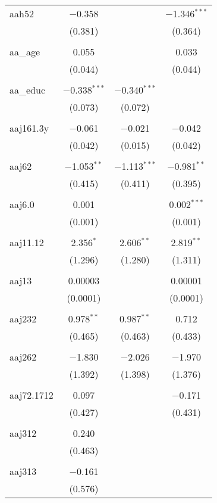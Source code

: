 \begin{table}[!htbp]
\begin{tabular}{@{\extracolsep{5pt}}lccc}
 aah52 & $-$0.358 &  & $-$1.346$^{***}$ \\ 
  & (0.381) &  & (0.364) \\ 
  & & & \\ 
 aa\_age & 0.055 &  & 0.033 \\ 
  & (0.044) &  & (0.044) \\ 
  & & & \\ 
 aa\_educ & $-$0.338$^{***}$ & $-$0.340$^{***}$ &  \\ 
  & (0.073) & (0.072) &  \\ 
  & & & \\ 
 aaj161.3y & $-$0.061 & $-$0.021 & $-$0.042 \\ 
  & (0.042) & (0.015) & (0.042) \\ 
  & & & \\ 
 aaj62 & $-$1.053$^{**}$ & $-$1.113$^{***}$ & $-$0.981$^{**}$ \\ 
  & (0.415) & (0.411) & (0.395) \\ 
  & & & \\ 
 aaj6.0 & 0.001 &  & 0.002$^{***}$ \\ 
  & (0.001) &  & (0.001) \\ 
  & & & \\ 
 aaj11.12 & 2.356$^{*}$ & 2.606$^{**}$ & 2.819$^{**}$ \\ 
  & (1.296) & (1.280) & (1.311) \\ 
  & & & \\ 
 aaj13 & 0.00003 &  & 0.00001 \\ 
  & (0.0001) &  & (0.0001) \\ 
  & & & \\ 
 aaj232 & 0.978$^{**}$ & 0.987$^{**}$ & 0.712 \\ 
  & (0.465) & (0.463) & (0.433) \\ 
  & & & \\ 
 aaj262 & $-$1.830 & $-$2.026 & $-$1.970 \\ 
  & (1.392) & (1.398) & (1.376) \\ 
  & & & \\ 
 aaj72.1712 & 0.097 &  & $-$0.171 \\ 
  & (0.427) &  & (0.431) \\ 
  & & & \\ 
 aaj312 & 0.240 &  &  \\ 
  & (0.463) &  &  \\ 
  & & & \\ 
 aaj313 & $-$0.161 &  &  \\ 
  & (0.576) &  &  \\ 

\end{tabular}
\end{table}
